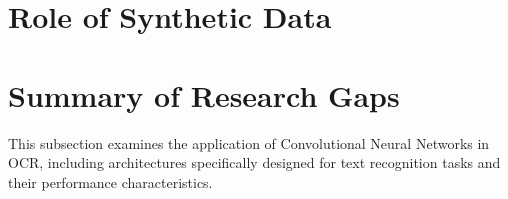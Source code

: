\section{Role of Synthetic Data}
\label{sec:dl-models}

\section{Summary of Research Gaps }
\label{sec:cnn}
This subsection examines the application of Convolutional Neural Networks in OCR, including architectures specifically designed for text recognition tasks and their performance characteristics.
